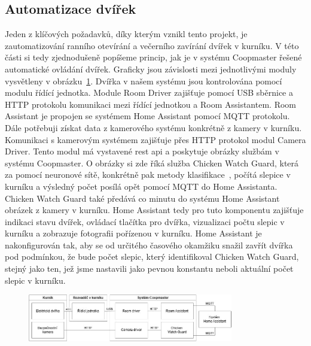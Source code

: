 \subsection{Automatizace dvířek}
Jeden z klíčových požadavků, díky kterým vznikl tento projekt, je zautomatizování ranního otevírání a večerního zavírání dvířek v kurníku.
V této části si tedy zjednodušeně popíšeme princip, jak je v systému Coopmaster řešené automatické ovládání dvířek.
Graficky jsou závislosti mezi jednotlivými moduly vysvětleny v obrázku~\ref{fig:automatizace_dvirek}.\newline
Dvířka v našem systému jsou kontrolována pomocí modulu řídící jednotka.
Module Room Driver zajišťuje pomocí USB sběrnice a HTTP protokolu komunikaci mezi řídící jednotkou a Room Assistantem.
Room Assistant je propojen se systémem Home Assistant pomocí MQTT protokolu.
Dále potřebuji získat data z kamerového systému konkrétně z kamery v kurníku.
Komunikaci s kamerovým systémem zajišťuje přes HTTP protokol modul Camera Driver.
Tento modul má vystavené \gls{rest} \gls{api} a poskytuje obrázky službám v systému Coopmaster.
O obrázky si zde říká služba Chicken Watch Guard, která za pomocí neuronové sítě, konkrétně pak metody klasifikace~\cite{klasifikace}, počítá slepice v kurníku a výsledný počet posílá opět pomocí MQTT do Home Assistanta.
Chicken Watch Guard také předává co minutu do systému Home Assistant obrázek z kamery v kurníku.
Home Assistant tedy pro tuto komponentu zajišťuje indikaci stavu dvířek, ovládací tlačítka pro dvířka, vizualizaci počtu slepic v kurníku a zobrazuje fotografii pořízenou v kurníku.
Home Assistant je nakonfigurován tak, aby se od určitého časového okamžiku snažil zavřít dvířka pod podmínkou, že bude počet slepic, který identifikoval Chicken Watch Guard, stejný jako ten, jež jsme nastavili jako pevnou konstantu neboli aktuální počet slepic v kurníku.
\begin{figure}[h]
    \centering
    \includegraphics[width=0.8\textwidth]{img/automatizace_dvirek}
    \label{fig:automatizace_dvirek}
\end{figure}

